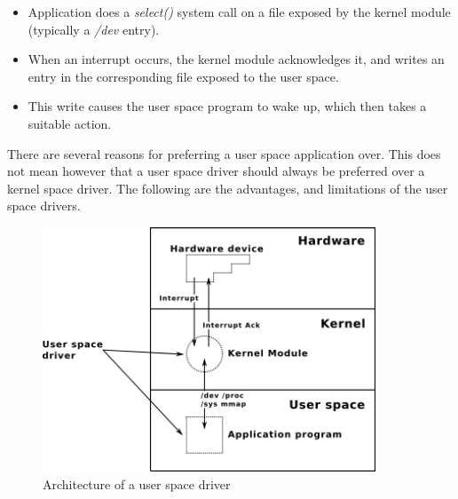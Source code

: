 \documentclass[twoside]{iitbreport}
\begin{document}
\begin{itemize}
\item Application does a \textit{select()} system call on a file exposed by the kernel module (typically a \textit{/dev} entry).
\item When an interrupt occurs, the kernel module acknowledges it, and writes an entry in the corresponding file exposed to the user space.
\item This write causes the user space program to wake up, which then takes a suitable action.
\end{itemize}

There are several reasons for preferring a user space application over. This does not mean however that a user space driver should always be preferred over a kernel space driver. The following are the advantages, and limitations of the user space drivers.

\begin{figure}[ht]
\centering
\includegraphics[width=375px]{user-space-driver1_svg}
\caption{Architecture of a user space driver\label{fig:user-space-driver1}}
\end{figure}
\end{document}
